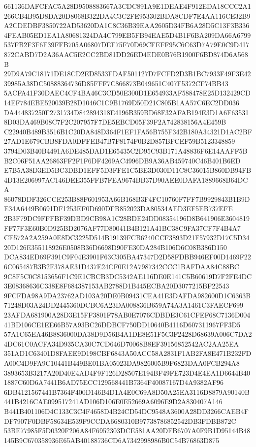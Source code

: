 \documentclass[UTF8,fontset=fandol,zihao=-4,a4paper]{ctexart}
\begin{document}
{{661136DAFCFAC5A28D9508883667A3CDC891A9E1DEAE4F912EDA18CCC2A1266CB4B95D8DA20D8068B322DA4C3C2FE953302BDA8CDF7E4AA116CE32B9
A2CDEDBF3850722AD53620DA1C8C36B39EAA2605D34FB6A28D5C13F3B3364FEAB05ED1EA1A80681324DA4C799EB5FB94EAE5D4B1F6BA209DA66A6799
537FB2F3F6F39FFB705A06807DEF75F70D69CFEFF95C6C63D7A79E0C9D417872CABD7D2A36AAC5E2CC2BD81DD26ED4EDE0B76B1900F6BD874D6A568B
29D9A79C18171DE18CD2ED8533FDAF501127D7FCFD2D3B1BC7933F49F3E4239985A38DC50888364736D85FFF7C866873B049651C407F5372CF74BB43
5ACFA41F30DAEC4CF4BA46C3CD50E300D1E654933AF588478E25D132429CD14EF784EBE520039B28D1046C1C9B1769D50D21C805B1AA57C6EC2DD036
DA444837250F2731734D842894318E4196B359BD68F32AFAB194E3D1A6F635318D03DA469B08C7F2C207957F7DE5EBCD05F39F2A742838156A4E459B
C22940B489B3516B1C20DA848D364F1EF1FA56B755F342B180A34321D1AC2BF27AD1E679CBB8FDA0DFFEB47B7F8174F0B2D857BFCEF59B5123348859
3794D03B40B4491A6DE485DAD1E65435C2D95C93B171A48836F6E14AAFF5BB2C06F51AA26863FF2F1F6DF4269AC4996DB9A36AB459740C46B401B6ED
E7B5A38D3ED5BC3DBD1EFF5D3FFE1C5BE3D030D11C8C36015B860DB94FB4D13E206997AC146DEE355FFB7FEA9674BB37D90AEE0DAFA1889668B64DCA
86078DDF326CCE253B88F601953A66B168B3F4FC10760F7FF7B9929843B1B9DE34A6449B0691DF1253EF0D690DFB852023DA80534AED3EF5EB737EFE
2B3F79DC9FFFBF39DBD9CB98A1C28BDE24DD08354196D8B641906E3604819FF77F3E60B0D925BD2076AF77D80041B4B121A41BC38C9FA37CF7F4B4A7
CE572A2A259A0E8DC3225D514B19139FCB6240CCF3893D21F57932D17C5D3420D126E355118926E0508B36D6698D90FE30DA284B106D6C08B386D150
DCA834ED69F391C9F04E3901F63C305BA47347D2D58FDBB946EF00D1469F226C065487B3B2F378AE31D437E24CF0E12A7987342CCC1BAFDAA84C88BC
9C8F5C0C8153656F1C9E1CBCB3DC5342AE116DE0E141C5B60619D7F2FE4DC3E08368636C338E8F684387153AB2788D1B445ECBA20D3077215BF22543
9FCFDA98A9DA23762AD103A20DE0B09431CEA41E3DAFDA982600D1C6363B71248D03A24DD2445360DCBC6A23DA008836B659A74A3A1461C3FAECF699
23AFDA681900A28D3E15FF3801F78AB0E7076CDBDE3C61CFEF68C7136D00441BD106CE1EE66B57A93BC26DDBCF750DD10640B4116D607311967FF3D5
57A1C65EA46B8836000DA38D9D56B4A1DE8E51F5C3F2428D68639A006C7DA24DC61C0ACFA34D935CA30C7CD646D70068B8EF39156852542AC2AA25EA
351AD1C63401D8FAEE9D198CBF6843A50ACC58A2831F1AB2FA8E471B232FDA00C4D9FA9C10441B449BE01BA05023DA9826005B9F6823DAA0FCB294A8
3893653B3217A20D40E4AD4F9F126D28507E194BF49FE723D4E4EA1D6644B401887C60D6A7441B6AD75ECC129568441B7364F40087167D4A9382AF96
6DB4121567441B7364F400D146B4D1A4E0C69A8D50A25EA3116D8879A90140B441B4216CAE099517241AD106D106E0E52669A6096E9D2A830407A146
B441B401106D4C133C3C4F4658D4B24CD54DC9548A3600A28DD3266CAEB4FDF7907F0DBF58634E539F9CCDA6680310B97738786852542DB3FDBB872C
53BE77985F5D0320F206A84F6952303DCE581AA20DFB6707A0F9B1D95144B48145B9C670358936E65AB40188736CD6A7342998986B0C54B76863D875
}}
\end{document}
